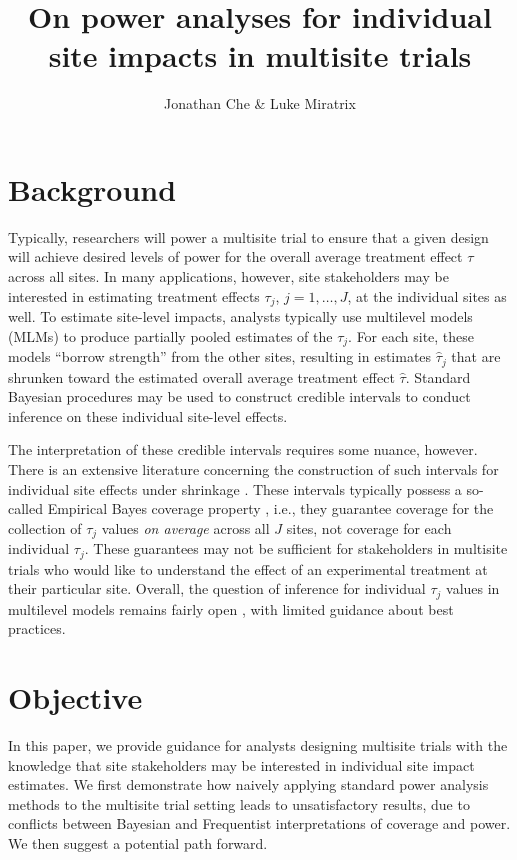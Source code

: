 \documentclass[]{article}
\title{On power analyses for individual site impacts in multisite trials}
\author{Jonathan Che \& Luke Miratrix}
\begin{document}
\maketitle


\section{Background}

Typically, researchers will power a multisite trial to ensure that a given design will achieve desired levels of power for the overall average treatment effect $\tau$ across all sites. 
In many applications, however, site stakeholders may be interested in estimating treatment effects $\tau_j$, $j = 1, \ldots, J$, at the individual sites as well.
To estimate site-level impacts, analysts typically use multilevel models (MLMs) to produce partially pooled estimates of the $\tau_j$.
For each site, these models ``borrow strength'' from the other sites, resulting in estimates $\hat{\tau}_j$ that are shrunken toward the estimated overall average treatment effect $\hat{\tau}$.
Standard Bayesian procedures may be used to construct credible intervals to conduct inference on these individual site-level effects.

The interpretation of these credible intervals requires some nuance, however.
There is an extensive literature concerning the construction of such intervals for individual site effects under shrinkage \citep{casella2012shrinkage}.
These intervals typically possess a so-called Empirical Bayes coverage property \citep{morris1983parametric}, i.e., they guarantee coverage for the collection of $\tau_j$ values \textit{on average} across all $J$ sites, not coverage for each individual $\tau_j$.
These guarantees may not be sufficient for stakeholders in multisite trials who would like to understand the effect of an experimental treatment at their particular site.
Overall, the question of inference for individual $\tau_j$ values in multilevel models remains fairly open \citep{armstrong2020robust}, with limited guidance about best practices.

\section{Objective}

In this paper, we provide guidance for analysts designing multisite trials with the knowledge that site stakeholders may be interested in individual site impact estimates.
We first demonstrate how naively applying standard power analysis methods to the multisite trial setting leads to unsatisfactory results, due to conflicts between Bayesian and Frequentist interpretations of coverage and power.
We then suggest a potential path forward.
\end{document}
